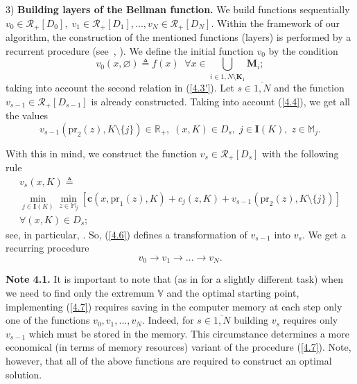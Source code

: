 3) {\bf Building layers of the Bellman function.}
We build functions sequentially
$v_0 \in \mathcal{R}_+[D_0],\;v_1 \in \mathcal{R}_+[D_1],...,v_N \in \mathcal{R}_+[D_N]$.
Within the framework of our algorithm, the construction of the mentioned functions
(layers)
is performed by a recurrent procedure
(see~\cite[$\S$4.9]{14}, \cite{18}).
We define
the initial
function $ v_0 $ by the condition
\begin{equation}\label{4.5}
  v_0(x,\varnothing) {\triangleq} f(x)\;\;
  \forall{x} \in \bigcup\limits_{i \in \overline{1,N} \setminus \mathbf{K}_1} \mathbf{\mathbf{M}}_i;
\end{equation}
taking into account the second relation in (\ref{4.3'}).
Let $s \in \overline{1,N}$
and the function
$v_{s-1} \in \mathcal{R}_+[D_{s-1}]$
is already constructed.
Taking into account
 (\ref{4.4}),
we get all the values
$$
  v_{s-1}(\mathrm{pr}_2(z),K \setminus \{j\}) \in \mathbb{R}_+,\;
  (x,K) \in D_s,\;j \in \mathbf{I}(K),\;z \in \mathbb{M}_j.
$$

With this in mind,
we construct the function
$v_s \in \mathcal{R}_+[D_s]$
with the following rule
\begin{multline}
  \label{4.6}
  v_s(x,K) {\triangleq} \\
  \min\limits_{j \in \mathbf{I}(K)} \min\limits_{z \in \mathbb{M}_j}
  [\mathbf{c}(x,\mathrm{pr}_1(z),K) + c_j(z,K) + v_{s-1}(\mathrm{pr}_2(z),K \setminus \{j\})] \\
  \forall{(x,K)} \in D_s;
\end{multline}
see, in particular,
\cite[(4.3.13)]{4}.
So, (\ref{4.6})
defines a transformation of
$v_{s-1}$ into $v_s.$
We get a recurring procedure
\begin{equation}\label{4.7}
  v_0 \longrightarrow v_1 \longrightarrow ... \longrightarrow v_N.
\end{equation}

{\bf Note 4.1.}
It is important to note that
(as in \cite {22} for a slightly different task)
when we need to find
only the extremum
$ \mathbb V $
and the optimal starting point,
implementing (\ref{4.7})
requires saving in the computer memory
at each step
only one of the functions
$v_0,v_1,...,v_N$.
Indeed,
for
$s \in \overline{1,N}$
building $v_s$
requires only $v_{s-1}$
which must be stored in the memory.
This circumstance determines a more economical
(in terms of memory resources)
variant of the procedure (\ref{4.7}).
Note, however,
that all of the above functions are required to construct an optimal solution.

